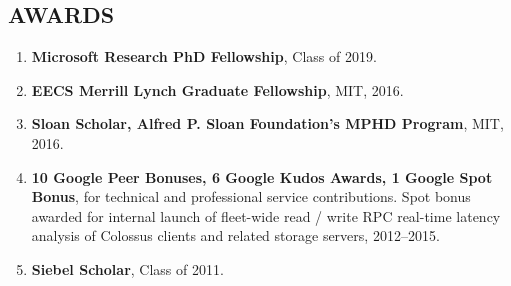 \documentclass[centered,overlapped]{res}
\begin{document}
\begin{resume}

%

\section{AWARDS}

\begin{enumerate}
  \item \textbf{Microsoft Research PhD Fellowship}, Class of 2019.
  \item \textbf{EECS Merrill Lynch Graduate Fellowship}, MIT, 2016.
  \item \textbf{Sloan Scholar, Alfred P. Sloan Foundation's MPHD Program}, MIT, 2016.
  \item \textbf{10 Google Peer Bonuses, 6 Google Kudos Awards, 1 Google Spot Bonus}, for technical and professional service contributions.  Spot bonus awarded for internal launch of fleet-wide read / write RPC real-time latency analysis of Colossus clients and related storage servers, 2012--2015.
  \item \textbf{Siebel Scholar}, Class of 2011.
\end{enumerate}


\end{resume}
\end{document}

